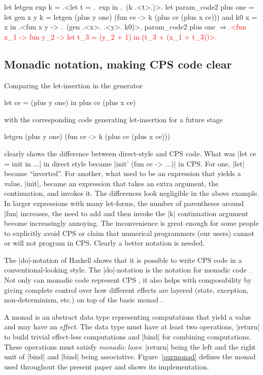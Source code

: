 \documentclass{elsart}
\newcommand{\evalresult}[1]{\ensuremath{\Longrightarrow}\textcolor{red}{#1}}
\begin{document}
\begin{code}
let letgen exp k = .<let t = .~exp in .~(k .<t>.)>.
let param_code2 plus one =
  let gen x y k = letgen (plus y one)
                         (fun ce -> k (plus ce (plus x ce)))
  and k0 x = x
  in .<fun x y -> .~(gen .<x>. .<y>. k0)>.
param_code2 plus one
\evalresult{.<fun x_1 -> fun y_2 -> let t_3 = (y_2 + 1) in (t_3 + (x_1 + t_3))>.}
\end{code}

\subsection{Monadic notation, making CPS code clear}\label{monadicnotation}

Comparing the let-insertion in the generator
\begin{code}
let ce = (plus y one) in  plus ce (plus x ce)
\end{code}
with the corresponding code generating let-insertion for a future
stage
\begin{code}
letgen (plus y one) (fun ce -> k (plus ce (plus x ce)))
\end{code}
clearly shows the difference between  direct-style and CPS code.
What was |let ce = init in ...| in direct style became
|init' (fun ce -> ...)| in CPS. For one, |let| became
``inverted''. For another, what used to be an expression that yields
a value, |init|, became an expression that takes an extra argument,
the continuation, and invokes it. The differences look negligible in
the above example. In larger expressions with many let-forms, the
number of parentheses around |fun| increases, the need to add and
then invoke the |k| continuation argument become increasingly annoying. The
inconvenience is great enough for some people to explicitly avoid CPS
or claim that numerical programmers (our users) cannot or will not
program in CPS. Clearly a better notation is needed.

The |do|-notation of Haskell \cite{Haskell98Report} shows that it is possible
to write CPS code in a conventional-looking style. The
|do|-notation is the notation for monadic code \cite{moggi-notions}.
Not only can monadic code represent CPS \cite{Filinski:Representing},
it also helps with composability by giving complete control over how
different effects are layered
(state, exception, non-determinism, etc.) on top of the
basic monad \cite{liang-interpreter}.

A monad \cite{moggi-notions} is an abstract data type representing
computations that yield a value and may have an \emph{effect}.
The data type must have at least two operations, |return| to build
trivial effect-less computations and |bind| for combining
computations. These operations must satisfy \emph{monadic laws}:
|return| being the left and the right unit of |bind| and |bind| being
associative. Figure~\ref{ourmonad} defines the monad used throughout
the present paper and shows its implementation.
\end{document}
